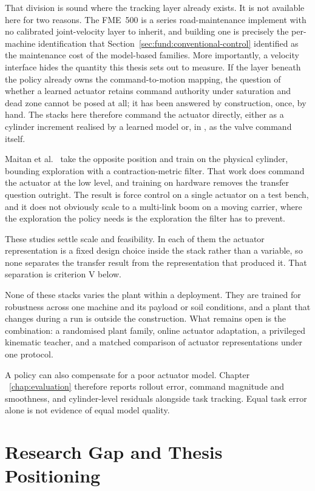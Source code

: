 That division is sound where the tracking layer already exists. It is not
available here for two reasons. The FME~500 is a series road-maintenance
implement with no calibrated joint-velocity layer to inherit, and building one
is precisely the per-machine identification that
Section~\ref{sec:fund:conventional-control} identified as the maintenance cost
of the model-based families. More importantly, a velocity interface hides the
quantity this thesis sets out to measure. If the layer beneath the policy
already owns the command-to-motion mapping, the question of whether a learned
actuator retains command authority under saturation and dead zone cannot be
posed at all; it has been answered by construction, once, by hand. The stacks
here therefore command the actuator directly, either as a cylinder increment
realised by a learned model or, in \ppoAAMFD, as the valve command itself.

Maitan et al.~\cite{maitan2026contraction} take the opposite position and train
on the physical cylinder, bounding exploration with a contraction-metric
filter. That work does command the actuator at the low level, and training on
hardware removes the transfer question outright. The result is force control on
a single actuator on a test bench, and it does not obviously scale to a
multi-link boom on a moving carrier, where the exploration the policy needs is
the exploration the filter has to prevent.

These studies settle scale and feasibility. In each of them the actuator
representation is a fixed design choice inside the stack rather than a
variable, so none separates the transfer result from the representation that
produced it. That separation is criterion V below.

None of these stacks varies the plant within a deployment. They are trained for
robustness across one machine and its payload or soil conditions, and a plant
that changes during a run is outside the construction. What remains open is the
combination: a randomised plant family, online actuator adaptation, a
privileged kinematic teacher, and a matched comparison of actuator
representations under one protocol.

A policy can also compensate for a poor actuator model. Chapter
~\ref{chap:evaluation} therefore reports rollout error, command magnitude and
smoothness, and cylinder-level residuals alongside task tracking. Equal task
error alone is not evidence of equal model quality.

\section{Research Gap and Thesis Positioning}
\label{sec:fund:gap}


